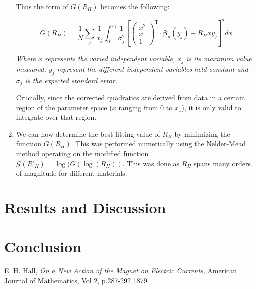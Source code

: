 \documentclass{article}
\begin{document}
\begin{enumerate}
			\noindent Thus the form of $G(R_H)$ becomes the following:
			
			\begin{equation}
				G(R_H) = \frac{1}{N}\sum_j\frac{1}{x_j}\int_{0}^{x_j}\frac{1}{\sigma_j^2}\left[\begin{pmatrix} x^2 \\ x \\ 1\end{pmatrix}^\mathrm{T}\cdot\boldsymbol{\beta}_\mu(y_j) - R_Hxy_j\right]^2 dx
			\end{equation}
			\begin{center}\emph{Where $x$ represents the varied independent variable, $x_j$ is its maximum value measured, $y_j$ represent the different independent variables held constant and $\sigma_j$ is the expected standard error.}\end{center}
			
			\noindent Crucially, since the corrected quadratics are derived from data in a certain region of the parameter space ($x$ ranging from $0$ to $x_1$), it is only valid to integrate over that region.
			
			\item We can now determine the best fitting value of $R_H$ by minimizing the function $G(R_H)$. This was performed numerically using the Nelder-Mead method operating on the modified function $\mathcal{G}(R'_H) = \log(G(\log(R_H))$. This was done as $R_H$ spans many orders of magnitude for different materials.
		\end{enumerate}
	
	\section{Results and Discussion}
	
	\section{Conclusion}
	
	\newpage
	\begin{thebibliography}{9}
			E. H. Hall,
			\emph{On a New Action of the Magnet on Electric Currents},
			American Journal of Mathematics, Vol 2, p.287-292
			1879
	\end{thebibliography}
\end{document}
